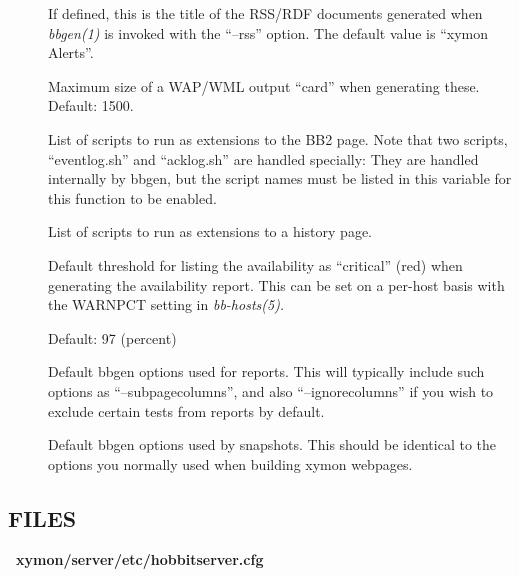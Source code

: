 \begin{description}
\item[] If defined, this is the title of the RSS/RDF documents generated when \emph{bbgen(1)}
 is invoked with the ``--rss'' option. The default value is ``xymon Alerts''. 

 

\item[] Maximum size of a WAP/WML output ``card'' when generating these. Default: 1500. 

 

\item[] List of scripts to run as extensions to the
  BB2 page. Note that two scripts, ``eventlog.sh'' and ``acklog.sh''
  are handled specially: They are handled internally by bbgen, but the
  script names must be listed in this variable for this function to be
  enabled. 


 

\item[] List of scripts to run as extensions to a history page. 

 

\item[] Default threshold for listing the
  availability as ``critical'' (red) when generating the availability
  report. This can be set on a per-host basis with the WARNPCT setting
  in \emph{bb-hosts(5).}

 Default: 97 (percent) 

 

\item[] Default bbgen options used for
  reports. This will typically include such options as
  ``--subpagecolumns'', and also ``--ignorecolumns'' if you wish to
  exclude certain tests from reports by default. 


 

\item[] Default bbgen options used by
  snapshots. This should be identical to the options you normally used
  when building xymon webpages. 



\end{description}

\subsection{FILES}
\textbf{~xymon/server/etc/hobbitserver.cfg}


